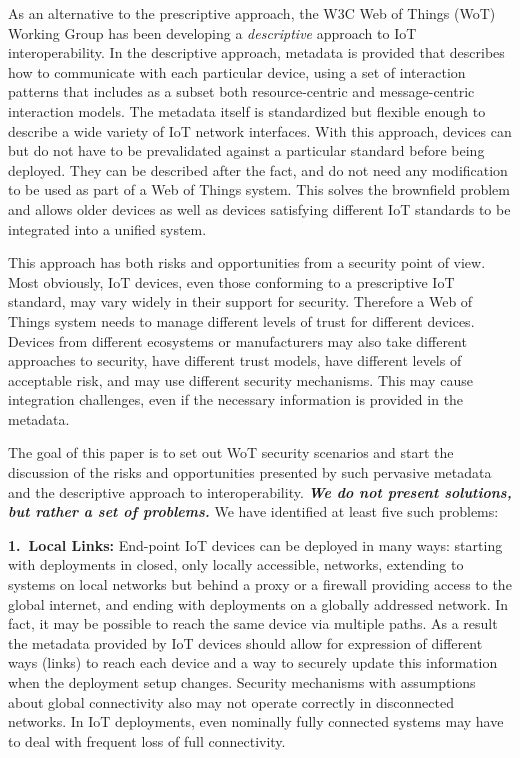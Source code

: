 As an alternative to the prescriptive approach,
the W3C Web of Things (WoT) Working Group has been developing a \emph{descriptive} 
approach to IoT interoperability.
In the descriptive approach,
metadata is provided that describes how to communicate with each particular device,
using a set of interaction patterns that includes as a subset both resource-centric
and message-centric interaction models.
The metadata itself is standardized but flexible enough to describe a wide variety of
IoT network interfaces.
With this approach,
devices can but do not have to be prevalidated against 
a particular standard before being deployed.
They can be described after the fact,
and do not need any modification to be
used as part of a Web of Things system.
This solves the brownfield problem and allows
older devices as well as devices satisfying different IoT 
standards to be integrated into a unified system.  

This approach has both risks and opportunities from a security point of view.
Most obviously, IoT devices, even those conforming to a prescriptive IoT standard,
may vary widely in their support for security.
Therefore a Web of Things system
needs to manage different levels of trust for different devices.
Devices from different ecosystems or manufacturers may also take different approaches to
security, have different trust models, have different levels of acceptable risk,
and may use different security mechanisms. 
This may cause integration challenges, even if the necessary
information is provided in the metadata.

The goal of this paper is to set out WoT security scenarios
and start the discussion of the risks and opportunities presented
by such pervasive metadata and the descriptive approach to interoperability.  
\textit{\textbf{We do not present solutions, but rather a set of problems.}}
We have identified at least five such problems:

\noindent\textbf{1.~Local Links:}
End-point IoT devices can be deployed in many ways: 
starting with deployments in closed, only locally accessible,
networks, extending to systems on local networks but behind a proxy or a firewall 
providing access to the global internet, and ending with deployments on a globally addressed network. 
In fact, it may be possible to reach the same device via multiple paths.
As a result the metadata provided by IoT devices should allow for expression of
different ways (links) to reach each device 
and a way to securely update this information when the deployment setup changes. 
Security mechanisms with assumptions about global connectivity also may not
operate correctly in disconnected networks.
In IoT deployments, even nominally fully connected systems may have to 
deal with frequent loss of full connectivity.

